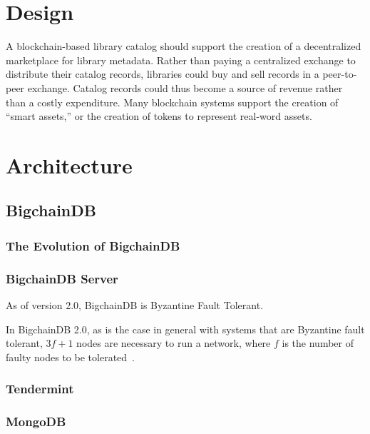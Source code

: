 \section{Design}
A blockchain-based library catalog should support the creation of a
decentralized marketplace for library metadata. Rather than paying a
centralized exchange to distribute their catalog records, libraries could
buy and sell records in a peer-to-peer exchange. Catalog records could thus
become a source of revenue rather than a costly expenditure. Many blockchain
systems support the creation of ``smart assets,'' or the creation of tokens
to represent real-word assets. 




\section{Architecture}
\subsection{BigchainDB}
\subsubsection{The Evolution of BigchainDB}

\subsubsection{BigchainDB Server}


As of version 2.0, BigchainDB is Byzantine Fault Tolerant.

﻿In BigchainDB 2.0, as is the case in general with systems that are
Byzantine fault tolerant, $3f + 1$ nodes are necessary to run a network,
where $f$ is the number of faulty nodes to be tolerated~\cite{bdb18}.
\subsubsection{Tendermint}
\subsubsection{MongoDB}



